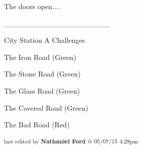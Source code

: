 The doors open....



\_\_\_\_\_\_\_\_\_\_\_\_\_\_\_\_\_\_\_\_



 {\LARGE City Station A Challenges } 



The Iron Road (Green)

The Stone Road (Green)

The Glass Road (Green)

The Covered Road (Green)

The Bad Road (Red)


\iffalse

======================
THESE ARE ERRORS ENCOUNTERED DURING THE EXPORT PROCESS
======================

	Unable to highlight for footnote: I feel like there was some other comment, some sort of warning about how Jaya better not misuse/abuse this additional personnel or something, but I have nothing in my notes. because:GivenExpectedI will make the situation clear to her,I will make that clear to her,


\fi

\vspace{\fill}

\begin{flushright}
\textsubscript{last edited by \textbf{Nathaniel Ford} @ 05/07/15 4:28pm}
\end{flushright}

